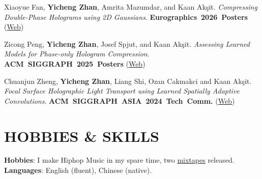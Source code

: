 \documentclass[10pt,a4paper]{article}
\begin{document}
\begin{enumerate}[label={[\arabic*]}, leftmargin=*, before=\raggedright]
\item Xiaoyue Fan, \textbf{Yicheng Zhan}, Amrita Mazumdar, and Kaan Akşit. \textit{Compressing Double-Phase Holograms using 2D Gaussians}. \mbox{\textcolor{venue}{\textbf{Eurographics 2026 Posters}}} (\href{https://complightlab.com/publications/compressing_double_phase_gs/}{Web})
\item Zicong Peng, \textbf{Yicheng Zhan}, Josef Spjut, and Kaan Akşit. \textit{Assessing Learned Models for Phase-only Hologram Compression}. \mbox{\textcolor{venue}{\textbf{ACM SIGGRAPH 2025 Posters}}} (\href{https://complightlab.com/publications/assess_hologram_compression/}{Web})
\item Chuanjun Zheng, \textbf{Yicheng Zhan}, Liang Shi, Ozan Cakmakci and Kaan Akşit. \textit{Focal Surface Holographic Light Transport using Learned Spatially Adaptive Convolutions}. \mbox{\textcolor{venue}{\textbf{ACM SIGGRAPH ASIA 2024 Tech Comm.}}} (\href{https://complightlab.com/publications/focal_surface_light_transport/}{Web})
\end{enumerate}

\section*{HOBBIES \& SKILLS}
\textbf{Hobbies}: I make Hiphop Music in my spare time, two \href{https://albertgary.github.io/music/}{mixtapes} released. \hfill \textbf{Languages}: English (fluent), Chinese (native).
\end{document}
